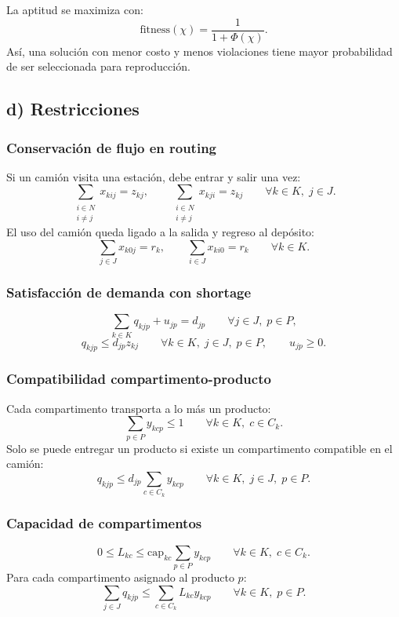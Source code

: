 \documentclass[11pt,letterpaper]{article}
\begin{document}
La aptitud se maximiza con:
\[
    \mathrm{fitness}(\chi)=\frac{1}{1+\Phi(\chi)}.
\]
Así, una solución con menor costo y menos violaciones tiene mayor probabilidad de ser
seleccionada para reproducción.

\subsection{d) Restricciones}

\subsubsection*{Conservación de flujo en routing}
Si un camión visita una estación, debe entrar y salir una vez:
\[
    \sum_{\substack{i\in N\\i\neq j}}x_{kij}=z_{kj},
    \qquad
    \sum_{\substack{i\in N\\i\neq j}}x_{kji}=z_{kj}
    \qquad \forall k\in K,\; j\in J.
\]
El uso del camión queda ligado a la salida y regreso al depósito:
\[
    \sum_{j\in J}x_{k0j}=r_k,
    \qquad
    \sum_{i\in J}x_{ki0}=r_k
    \qquad \forall k\in K.
\]

\subsubsection*{Satisfacción de demanda con shortage}
\[
    \sum_{k\in K}q_{kjp}+u_{jp}=d_{jp}
    \qquad \forall j\in J,\;p\in P,
\]
\[
    q_{kjp}\le d_{jp}z_{kj}
    \qquad \forall k\in K,\;j\in J,\;p\in P,
    \qquad
    u_{jp}\ge 0.
\]

\subsubsection*{Compatibilidad compartimento-producto}
Cada compartimento transporta a lo más un producto:
\[
    \sum_{p\in P}y_{kcp}\le 1
    \qquad \forall k\in K,\;c\in C_k.
\]
Solo se puede entregar un producto si existe un compartimento compatible en el camión:
\[
    q_{kjp}\le d_{jp}\sum_{c\in C_k}y_{kcp}
    \qquad \forall k\in K,\;j\in J,\;p\in P.
\]

\subsubsection*{Capacidad de compartimentos}
\[
    0\le L_{kc}\le \mathrm{cap}_{kc}\sum_{p\in P}y_{kcp}
    \qquad \forall k\in K,\;c\in C_k.
\]
Para cada compartimento asignado al producto \(p\):
\[
    \sum_{j\in J}q_{kjp}\le
    \sum_{c\in C_k}L_{kc}y_{kcp}
    \qquad \forall k\in K,\;p\in P.
\]
\end{document}
